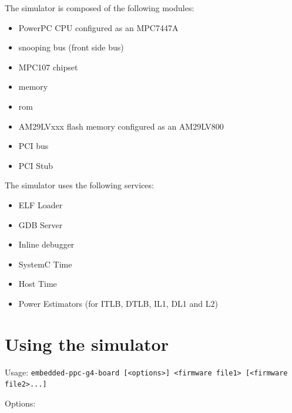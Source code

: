 The simulator is composed of the following modules:
\begin{itemize}\addtolength{\itemsep}{-0.40\baselineskip}
\item PowerPC CPU configured as an MPC7447A
\item snooping bus (front side bus)
\item MPC107 chipset
\item memory
\item rom
\item AM29LVxxx flash memory configured as an AM29LV800
\item PCI bus
\item PCI Stub
\end{itemize}

The simulator uses the following services:
\begin{itemize}\addtolength{\itemsep}{-0.40\baselineskip}
\item ELF Loader
\item GDB Server
\item Inline debugger
\item SystemC Time
\item Host Time
\item Power Estimators (for ITLB, DTLB, IL1, DL1 and L2)
\end{itemize}

\section{Using the simulator}

Usage: \texttt{embedded-ppc-g4-board [<options>] <firmware file1> [<firmware file2>...]}

Options:

